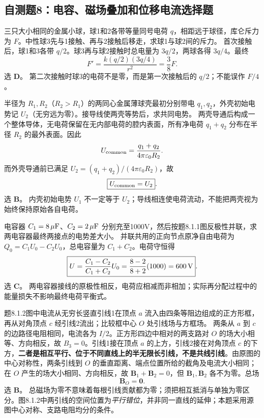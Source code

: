 \subsection{自测题8：电容、磁场叠加和位移电流选择题}

\problemtext 三只大小相同的金属小球，球1和2各带等量同号电荷 $q$，相距远于球径，库仑斥力为 $F$。中性球3先与1接触、再与2接触后移走，求球1与球2间的斥力。
\workings 首次接触后，球1和3各带 $q/2$。球3再与球2接触时总电量为 $3q/2$，两球各得 $3q/4$。最终
\[\boxed{F'=\frac{k(q/2)(3q/4)}{r^2}=\frac38F}.\]
选 \textbf{D}。
\crosscheck 第二次接触时球3的电荷不是零，而是第一次接触后的 $q/2$；不能误作 $F/4$。

\problemtext 半径为 $R_1,R_2$（$R_2>R_1$）的两同心金属薄球壳最初分别带电 $q_1,q_2$，外壳初始电势记 $U_2$（无穷远为零）。接导线使两壳等势后，求共同电势。
\workings 两壳导通后构成一个整体导体，无电荷保留在无内部电荷的腔内表面，所有净电荷 $q_1+q_2$ 分布在半径 $R_2$ 的最外表面。因此
\[U_{\rm common}=\frac{q_1+q_2}{4\pi\varepsilon_0R_2}.\]
而外壳导通前已满足 $U_2=(q_1+q_2)/(4\pi\varepsilon_0R_2)$，故
\[\boxed{U_{\rm common}=U_2}.\]
选 \textbf{B}。
\crosscheck 内壳初始电势 $U_1$ 不一定等于 $U_2$；导线相连使电荷流动，不能把两壳视为始终保持原始各自电荷。

\problemtext 电容器 $C_1=8\,\mu{\rm F}$、$C_2=2\,\mu{\rm F}$ 分别充至1000V，然后按题8.1.1图反极性并联，求两电容器最终两接点的电势差大小。
\workings 并联共用的正向节点原净自由电荷为 $Q_0=C_1U_0-C_2U_0$，总电容量为 $C_1+C_2$。电荷守恒得
\[
\boxed{U=\frac{C_1-C_2}{C_1+C_2}U_0
=\frac{8-2}{8+2}(1000)=600\,{\rm V}}.
\]
选 \textbf{C}。
\crosscheck 两电容器接线的原极性相反，电荷应相减而非相加；实际再分配过程中的能量损失不影响最终电荷平衡式。

\problemtext 题8.1.2图中电流从无穷长竖直引线1在顶点 $a$ 流入由四条等阻边组成的正方形框，再从对角顶点 $c$ 经引线2流出；比较框中心 $O$ 处引线场与方框场。
\workings 两条从 $a$ 到 $c$ 的边路径电阻相同，电流各为 $I/2$。正方形四边中相对的两支路对 $O$ 的场大小相等、方向相反，故 $\boxed{B_3=0}$。引线1接在顶点 $a$ 的上方，引线2接在对角顶点 $c$ 的下方，\textbf{二者是相互平行、位于不同直线上的半无限长引线，不是共线引线}。由原图的中心对称性，两条引线到 $O$ 的垂直距离、端点位置所给的截角及电流大小相同；在 $O$ 产生的场大小相同、方向相反，故 $\boxed{\bm B_1+\bm B_2=0}$，但 $\bm B_1,\bm B_2$ 各不为零。总场
\[\boxed{\bm B_O=\bm0}.\]
选 \textbf{B}。
\crosscheck 总磁场为零不意味着每根引线贡献都为零；须把相互抵消与单独为零区分。图8.1.2中两引线的空间位置为\emph{平行错位}，并非同一直线的延伸；本题采用源图中心对称、支路电阻均分的条件。

